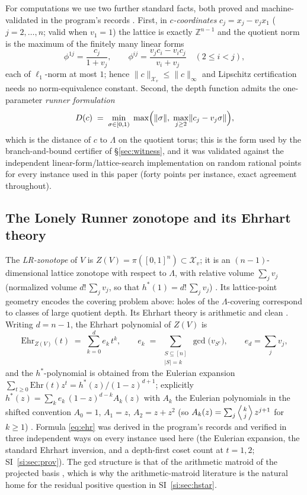 \documentclass[11pt,a4paper]{article}
\numberwithin{equation}{section}
\theoremstyle{plain}
\theoremstyle{definition}
\theoremstyle{remark}
\newcommand{\Z}{\mathbb{Z}}
\newcommand{\wnc}[1]{\lVert #1 \rVert}
\begin{document}
For computations we use two further standard facts, both proved and
machine-validated in the program's records \cite{prog-artifacts}. First,
in \emph{$c$-coordinates} $c_j=x_j-v_jx_1$ ($j=2,\dots,n$; valid when
$v_1=1$) the lattice is exactly $\Z^{n-1}$ and the quotient norm is the
maximum of the finitely many linear forms
\[
\phi^{1j}=\frac{c_j}{1+v_j},\qquad
\phi^{ij}=\frac{v_jc_i-v_ic_j}{v_i+v_j}\quad(2\le i<j),
\]
each of $\ell_1$-norm at most $1$; hence
$\|c\|_{\mathcal{X}_v}\le\|c\|_\infty$ and Lipschitz certification
needs no norm-equivalence constant. Second, the depth function admits the
one-parameter \emph{runner formulation}
\begin{equation}\label{eq:runnerform}
D(c)\;=\;\min_{\sigma\in[0,1)}\;\max\Bigl(\wnc{\sigma},\;
\max_{j\ge 2}\wnc{c_j-v_j\sigma}\Bigr),
\end{equation}
which is the distance of $c$ to $\Lambda$ on the quotient torus; this is
the form used by the branch-and-bound certifier of \S\ref{sec:witness},
and it was validated against the independent linear-form/lattice-search
implementation on random rational points for every instance used in this
paper (forty points per instance, exact agreement throughout).

\subsection{The Lonely Runner zonotope and its Ehrhart theory}

The \emph{LR-zonotope} of $V$ is $Z(V)=\pi([0,1]^n)\subset
\mathcal{X}_v$; it is an $(n{-}1)$-dimensional lattice zonotope with
respect to $\Lambda$, with relative volume $\sum_j v_j$ (normalized
volume $d!\,\sum_j v_j$, so that $h^*(1)=d!\,\sum_j v_j$)
\cite{Shephard,BeckRobins}. Its lattice-point geometry encodes the
covering problem above: holes of the $\Lambda$-covering correspond to
classes of large quotient depth. Its Ehrhart theory is arithmetic and
clean \cite{BeckRobins,dAMoci,StanleyEC}. Writing $d=n-1$, the Ehrhart
polynomial of $Z(V)$ is
\begin{equation}\label{eq:ehr}
\mathrm{Ehr}_{Z(V)}(t)\;=\;\sum_{k=0}^{d} e_k\,t^k,\qquad
e_k\;=\;\sum_{\substack{S\subseteq[n]\\|S|=k}}\gcd\!\bigl(v_{S^c}\bigr),
\qquad e_d=\sum_j v_j,
\end{equation}
and the $h^*$-polynomial is obtained
from the Eulerian expansion
$\sum_{t\ge0}\mathrm{Ehr}(t)z^t=h^*(z)/(1-z)^{d+1}$; explicitly
$h^*(z)=\sum_k e_k\,(1-z)^{d-k}A_k(z)$ with $A_k$ the Eulerian
polynomials in the shifted convention $A_0=1$, $A_1=z$, $A_2=z+z^2$
(so $A_k(z)=\sum_{j}\left\langle{k\atop j}\right\rangle z^{j+1}$ for
$k\ge1$) \cite{Frobenius}. Formula \eqref{eq:ehr} was derived in the
program's records and verified in three independent ways on every
instance used here (the Eulerian expansion, the standard Ehrhart
inversion, and a depth-first coset count at $t=1,2$;
SI~\ref{si:sec:prov}). The gcd structure is that of the arithmetic
matroid of the projected basis \cite{dAMoci}, which is why the
arithmetic-matroid literature is the natural home for the residual
positive question in SI~\ref{si:sec:hstar}.
\end{document}
